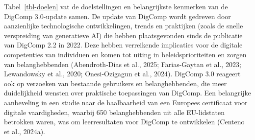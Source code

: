 \documentclass[
  dutch,
  letterpaper,
  DIV=11,
  numbers=noendperiod]{scrartcl}
\begin{document}
Tabel~\ref{tbl-doelen} vat de doelstellingen en belangrijkste kenmerken
van de DigComp 3.0-update samen. De update van DigComp wordt gedreven
door aanzienlijke technologische ontwikkelingen, trends en praktijken
(zoals de snelle verspreiding van generatieve AI) die hebben
plaatsgevonden sinds de publicatie van DigComp 2.2 in 2022. Deze hebben
verreikende implicaties voor de digitale competenties van individuen en
komen tot uiting in beleidsprioriteiten en zorgen van belanghebbenden
(Abendroth-Dias et al., 2025; Farias-Gaytan et al., 2023; Lewandowsky et
al., 2020; Onesi-Ozigagun et al., 2024). DigComp 3.0 reageert ook op
verzoeken van bestaande gebruikers en belanghebbenden, die meer
duidelijkheid wensten over praktische toepassingen van DigComp. Een
belangrijke aanbeveling in een studie naar de haalbaarheid van een
Europees certificaat voor digitale vaardigheden, waarbij 650
belanghebbenden uit alle EU-lidstaten betrokken waren, was om
leerresultaten voor DigComp te ontwikkelen (Centeno et al., 2024a).
\end{document}
